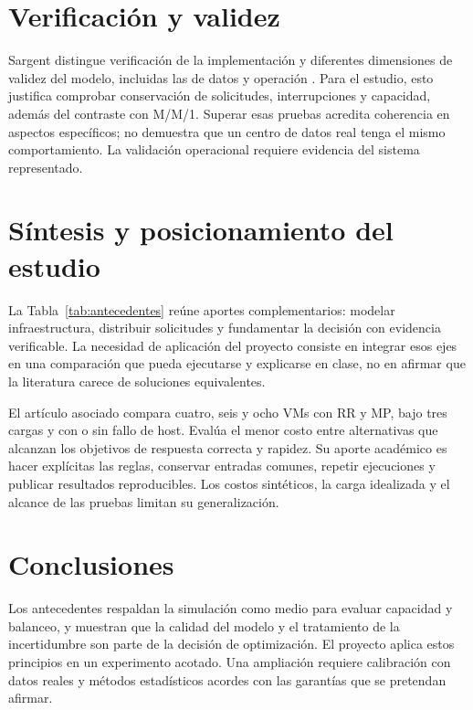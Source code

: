 \documentclass[conference,a4paper]{IEEEtran}
\begin{document}
\section{Verificación y validez}
Sargent distingue verificación de la implementación y diferentes dimensiones de validez del modelo, incluidas las de datos y operación \cite{sargent}. Para el estudio, esto justifica comprobar conservación de solicitudes, interrupciones y capacidad, además del contraste con M/M/1. Superar esas pruebas acredita coherencia en aspectos específicos; no demuestra que un centro de datos real tenga el mismo comportamiento. La validación operacional requiere evidencia del sistema representado.



\section{Síntesis y posicionamiento del estudio}
La Tabla~\ref{tab:antecedentes} reúne aportes complementarios: modelar infraestructura, distribuir solicitudes y fundamentar la decisión con evidencia verificable. La necesidad de aplicación del proyecto consiste en integrar esos ejes en una comparación que pueda ejecutarse y explicarse en clase, no en afirmar que la literatura carece de soluciones equivalentes.

\newpage
El artículo asociado compara cuatro, seis y ocho VMs con RR y MP, bajo tres cargas y con o sin fallo de host. Evalúa el menor costo entre alternativas que alcanzan los objetivos de respuesta correcta y rapidez. Su aporte académico es hacer explícitas las reglas, conservar entradas comunes, repetir ejecuciones y publicar resultados reproducibles. Los costos sintéticos, la carga idealizada y el alcance de las pruebas limitan su generalización.

\section{Conclusiones}
Los antecedentes respaldan la simulación como medio para evaluar capacidad y balanceo, y muestran que la calidad del modelo y el tratamiento de la incertidumbre son parte de la decisión de optimización. El proyecto aplica estos principios en un experimento acotado. Una ampliación requiere calibración con datos reales y métodos estadísticos acordes con las garantías que se pretendan afirmar.



\end{document}
